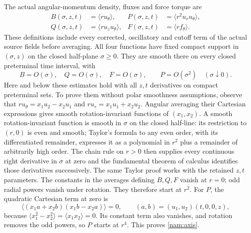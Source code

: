 The actual angular-momentum density, fluxes and force torque are
\begin{align*}
 B(\sigma,z,t)&=\langle r u_\theta\rangle,
 &P(\sigma,z,t)&=\langle r^2u_ru_\theta\rangle,\\
 Q(\sigma,z,t)&=\langle r u_zu_\theta\rangle,
 &F(\sigma,z,t)&=\langle r f_\theta\rangle.
\end{align*}
These definitions include every corrected, oscillatory and cutoff term
of the actual source fields before averaging. All four functions have
fixed compact support in $(\sigma,z)$ on the closed half-plane
$\sigma\geq0$. They are smooth there on every closed preterminal
time interval, with
\begin{equation}
 B=O(\sigma),\quad Q=O(\sigma),\quad F=O(\sigma),
 \qquad P=O(\sigma^2)\quad(\sigma\downarrow0).
 \label{nam:axis}
\end{equation}
Here and below these estimates hold with all $z,t$ derivatives on
compact preterminal sets. To prove them without polar smoothness
assumptions, observe that $r u_\theta=x_1u_2-x_2u_1$ and
$r u_r=x_1u_1+x_2u_2$. Angular averaging their Cartesian expressions
gives smooth rotation-invariant functions of $(x_1,x_2)$.
A smooth rotation-invariant function is smooth in $\sigma$ on the
closed half-line: its restriction to $(r,0)$ is even and smooth;
Taylor's formula to any even order, with its differentiated remainder,
expresses it as a polynomial in $r^2$ plus a remainder of arbitrarily
high order. The chain rule on $r>0$ then supplies every continuous
right derivative in $\sigma$ at zero and the fundamental theorem of
calculus identifies those derivatives successively. The same Taylor
proof works with the retained $z,t$ parameters.
The constants in the averages defining $B,Q,F$ vanish at $r=0$;
odd radial powers vanish under rotation. They therefore start at
$r^2$. For $P$, the quadratic Cartesian term at zero is
\[
 \big\langle(x_1a+x_2b)(x_1b-x_2a)\big\rangle=0,
 \qquad (a,b)=(u_1,u_2)(t,0,0,z),
\]
because $\langle x_1^2-x_2^2\rangle=
\langle x_1x_2\rangle=0$. Its constant term also vanishes, and
rotation removes the odd powers, so $P$ starts at $r^4$.
This proves \eqref{nam:axis}.

